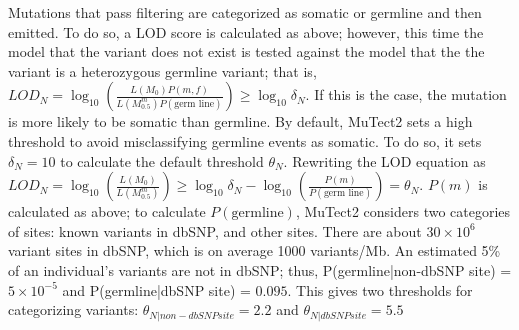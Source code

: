 Mutations that pass filtering are categorized as somatic or germline and then emitted. To do so, a LOD score is calculated as above; however, this time the model that the variant does not exist is tested against the model that the the variant is a heterozygous germline variant; that is, $LOD_N=\log_{10} \left(\frac{L(M_0)P(m,f)}{L(M_{0.5}^m)P(\text{germ line})}\right) \geq \log_{10} \delta{}_N$. If this is the case, the mutation is more likely to be somatic than germline. By default, MuTect2 sets a high threshold to avoid misclassifying germline events as somatic. To do so, it sets $\delta{}_N = 10$ to calculate the default threshold $\theta{}_N$. Rewriting the LOD equation as $LOD_N = \log_{10} \left(\frac{L(M_0)}{L(M_{0.5}^m)}\right) \geq \log_{10} \delta{}_N - \log_{10} \left(\frac{P(m)}{P(\text{germ line})}\right) = \theta{}_N$. $P(m)$ is calculated as above; to calculate $P(\text{germline})$, MuTect2 considers two categories of sites: known variants in dbSNP, and other sites. There are about $30 \times 10^6$ variant sites in dbSNP, which is on average 1000 variants/Mb. An estimated 5\% of an individual's variants are not in dbSNP; thus, P(germline|non-dbSNP site) = $5 \times 10^{-5}$ and P(germline|dbSNP site) = $0.095$. This gives two thresholds for categorizing variants: $\theta{}_{N|non-dbSNP site} = 2.2$ and $\theta{}_{N|dbSNP site} = 5.5$


